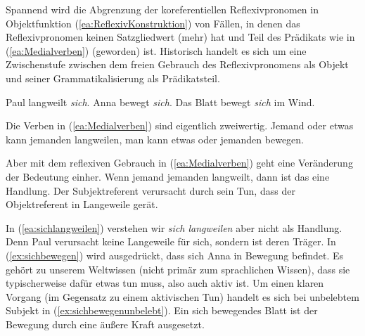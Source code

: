 \ea \label{ea:ReflVF}
\label{ea:sichVFwaschen}
\label{ex:*sichVFschämen}
\z 
\z 

Spannend wird die Abgrenzung der koreferentiellen Reflexivpronomen in Objektfunktion (\ref{ea:ReflexivKonstruktion}) von Fällen, in denen das Reflexivpronomen keinen Satzgliedwert (mehr) hat und Teil des Prädikats wie in (\ref{ea:Medialverben}) (geworden) ist. Historisch handelt es sich um eine Zwischenstufe zwischen dem freien Gebrauch des Reflexivpronomens als Objekt und seiner Grammatikalisierung als Prädikatsteil.  

\ea \label{ea:Medialverben}
\ea \label{ea:sichlangweilen} Paul langweilt \textit{sich}.   
\ex \label{ex:sichbewegen} Anna bewegt \textit{sich}. 
\ex \label{ex:sichbewegenunbelebt} Das Blatt bewegt \textit{sich} im Wind.
\z 
\z 

Die Verben in (\ref{ea:Medialverben}) sind eigentlich zweiwertig. Jemand oder etwas kann jemanden langweilen, man kann etwas oder jemanden bewegen. 

Aber mit dem reflexiven Gebrauch in (\ref{ea:Medialverben}) geht eine Veränderung der Bedeutung einher. Wenn jemand jemanden langweilt, dann ist das eine Handlung. Der Subjektreferent verursacht durch sein Tun, dass der Objektreferent in Langeweile gerät. 

In (\ref{ea:sichlangweilen}) verstehen wir \textit{sich langweilen} aber nicht als Handlung. Denn Paul verursacht keine Langeweile für sich, sondern ist deren Träger. In (\ref{ex:sichbewegen}) wird ausgedrückt, dass sich Anna in Bewegung befindet. Es gehört zu unserem Weltwissen (nicht primär zum sprachlichen Wissen), dass sie typischerweise dafür etwas tun muss, also auch aktiv ist. Um einen klaren Vorgang (im Gegensatz zu einem aktivischen Tun) handelt es sich bei unbelebtem Subjekt in (\ref{ex:sichbewegenunbelebt}). Ein sich bewegendes Blatt ist der Bewegung durch eine äußere Kraft ausgesetzt. 


